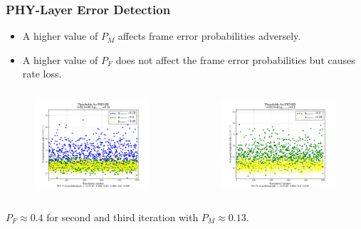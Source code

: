 \documentclass[xcolor=dvipsnames]{beamer}
\begin{document}
\begin{frame}[label=theta2]
\frametitle{PHY-Layer Error Detection}
\begin{itemize}
\item A higher value of $P_M$ affects frame error probabilities adversely.
\item A higher value of $P_F$ does not affect the frame error probabilities but causes rate loss. 
\end{itemize}
\begin{minipage}[1.1\textheight]{\textwidth}
\begin{columns}
\begin{column}{0.5\textwidth}
\begin{figure}
\centering
\includegraphics[width=6cm]{./theta0p15new.png}
\end{figure}
\end{column}
\begin{column}{0.5\textwidth}
\begin{figure}
\centering
\includegraphics[width=6cm]{./theta0p2.png}
\end{figure}
\end{column}
\end{columns}
\vspace{0.5cm}
\small $P_F\approx0.4$  for second and third iteration with $P_M\approx0.13$.
\end{minipage}
\end{frame}
\end{document}
